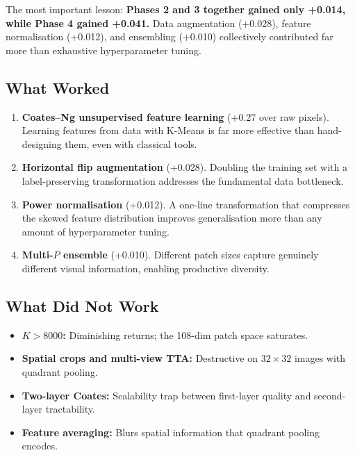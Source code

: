 \documentclass[11pt,a4paper]{article}
\begin{document}
The most important lesson: \textbf{Phases 2 and 3 together gained only +0.014,
while Phase 4 gained +0.041.}  Data augmentation (+0.028), feature
normalisation (+0.012), and ensembling (+0.010) collectively contributed far
more than exhaustive hyperparameter tuning.

\subsection{What Worked}

\begin{enumerate}[nosep]
  \item \textbf{Coates--Ng unsupervised feature learning} (+0.27 over raw
        pixels).  Learning features from data with K-Means is far more
        effective than hand-designing them, even with classical tools.
  \item \textbf{Horizontal flip augmentation} (+0.028).  Doubling the training
        set with a label-preserving transformation addresses the fundamental
        data bottleneck.
  \item \textbf{Power normalisation} (+0.012).  A one-line transformation that
        compresses the skewed feature distribution improves generalisation more
        than any amount of hyperparameter tuning.
  \item \textbf{Multi-$P$ ensemble} (+0.010).  Different patch sizes capture
        genuinely different visual information, enabling productive diversity.
\end{enumerate}

\subsection{What Did Not Work}

\begin{itemize}[nosep]
  \item \textbf{$K > 8000$:} Diminishing returns; the 108-dim patch space
        saturates.
  \item \textbf{Spatial crops and multi-view TTA:} Destructive on $32 \times
        32$ images with quadrant pooling.
  \item \textbf{Two-layer Coates:} Scalability trap between first-layer
        quality and second-layer tractability.
  \item \textbf{Feature averaging:} Blurs spatial information that quadrant
        pooling encodes.
\end{itemize}
\end{document}
